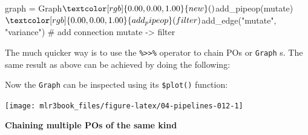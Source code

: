 \documentclass[
  11pt,
  parskip=half,
  DIV=calc,
  BCOR=10mm,
  x11names]{scrbook}
\newenvironment{Shaded}{}{}
\newcommand{\CommentTok}[1]{\textcolor[rgb]{0.00,0.50,0.00}{#1}}
\newcommand{\DataTypeTok}[1]{#1}
\newcommand{\KeywordTok}[1]{\textcolor[rgb]{0.00,0.00,1.00}{#1}}
\newcommand{\NormalTok}[1]{#1}
\newcommand{\OperatorTok}[1]{#1}
\newcommand{\OtherTok}[1]{\textcolor[rgb]{1.00,0.25,0.00}{#1}}
\newcommand{\StringTok}[1]{\textcolor[rgb]{0.00,0.50,0.50}{#1}}
\begin{document}
\begin{Shaded}
\end{Shaded}

\begin{Shaded}
\begin{Highlighting}[]
\NormalTok{graph =}\StringTok{ }\NormalTok{Graph}\OperatorTok{$}\KeywordTok{new}\NormalTok{()}\OperatorTok{$}\KeywordTok{add_pipeop}\NormalTok{(mutate)}\OperatorTok{$}\KeywordTok{add_pipeop}\NormalTok{(filter)}\OperatorTok{$}\KeywordTok{add_edge}\NormalTok{(}\StringTok{"mutate"}\NormalTok{, }
  \StringTok{"variance"}\NormalTok{)  }\CommentTok{# add connection mutate -> filter}
\end{Highlighting}
\end{Shaded}

The much quicker way is to use the \texttt{\%\textgreater{}\textgreater{}\%} operator to chain POs or \texttt{Graph} s.
The same result as above can be achieved by doing the following:

\begin{Shaded}
\end{Shaded}

Now the \texttt{Graph} can be inspected using its \texttt{\$plot()} function:

\begin{Shaded}
\end{Shaded}

\begin{center}\texttt{[image: mlr3book\_files/figure-latex/04-pipelines-012-1]} \end{center}

\textbf{Chaining multiple POs of the same kind}
\end{document}
